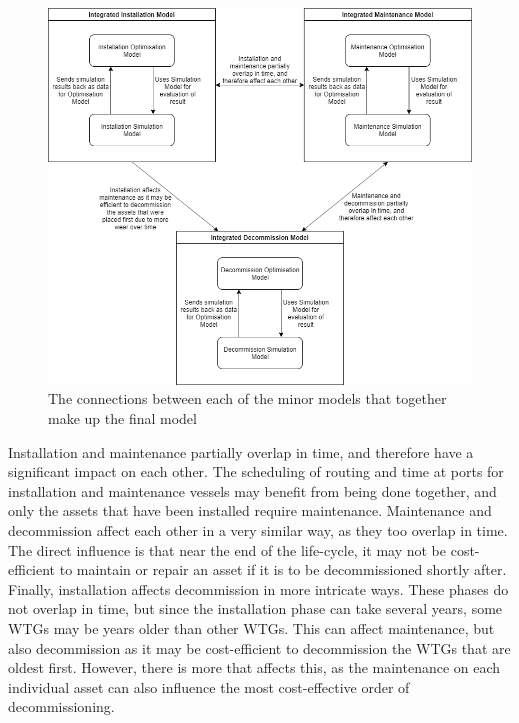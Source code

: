 \documentclass[a4paper,12pt]{article}
\begin{document}
\begin{figure}[h]
\includegraphics[width = \textwidth]{OWF Tool interactions}
\caption{The connections between each of the minor models that together make up the final model}
\label{f:interact}
\end{figure}

Installation and maintenance partially overlap in time, and therefore have a significant impact on each other. The scheduling of routing and time at ports for installation and maintenance vessels may benefit from being done together, and only the assets that have been installed require maintenance. Maintenance and decommission affect each other in a very similar way, as they too overlap in time. The direct influence is that near the end of the life-cycle, it may not be cost-efficient to maintain or repair an asset if it is to be decommissioned shortly after. Finally, installation affects decommission in more intricate ways. These phases do not overlap in time, but since the installation phase can take several years, some WTGs may be years older than other WTGs. This can affect maintenance, but also decommission as it may be cost-efficient to decommission the WTGs that are oldest first. However, there is more that affects this, as the maintenance on each individual asset can also influence the most cost-effective order of decommissioning. 

\bigskip
\end{document}
